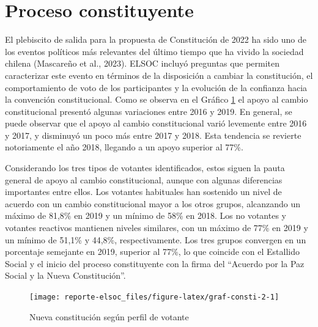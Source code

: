 \documentclass[
  12pt,
]{book}
\begin{document}
\hypertarget{proceso-constituyente}{%
\section{Proceso constituyente}\label{proceso-constituyente}}

El plebiscito de salida para la propuesta de Constitución de 2022 ha sido uno de los eventos políticos más relevantes del último tiempo que ha vivido la sociedad chilena (Mascareño et al., 2023). ELSOC incluyó preguntas que permiten caracterizar este evento en términos de la disposición a cambiar la constitución, el comportamiento de voto de los participantes y la evolución de la confianza hacia la convención constitucional. Como se observa en el Gráfico \ref{fig:graf-consti-2} el apoyo al cambio constitucional presentó algunas variaciones entre 2016 y 2019. En general, se puede observar que el apoyo al cambio constitucional varió levemente entre 2016 y 2017, y disminuyó un poco más entre 2017 y 2018. Esta tendencia se revierte notoriamente el año 2018, llegando a un apoyo superior al 77\%.

Considerando los tres tipos de votantes identificados, estos siguen la pauta general de apoyo al cambio constitucional, aunque con algunas diferencias importantes entre ellos. Los votantes habituales han sostenido un nivel de acuerdo con un cambio constitucional mayor a los otros grupos, alcanzando un máximo de 81,8\% en 2019 y un mínimo de 58\% en 2018. Los no votantes y votantes reactivos mantienen niveles similares, con un máximo de 77\% en 2019 y un mínimo de 51,1\% y 44,8\%, respectivamente. Los tres grupos convergen en un porcentaje semejante en 2019, superior al 77\%, lo que coincide con el Estallido Social y el inicio del proceso constituyente con la firma del ``Acuerdo por la Paz Social y la Nueva Constitución''.

\begin{figure}

{\centering \texttt{[image: reporte-elsoc\_files/figure-latex/graf-consti-2-1]} 

}

\caption{Nueva constitución según perfil de votante}\label{fig:graf-consti-2}
\end{figure}
\end{document}
